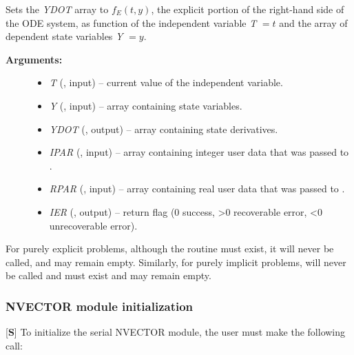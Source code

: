 \documentclass[letterpaper,10pt,english]{sphinxmanual}
\begin{document}
\begin{fulllineitems}
\label{f_interface/Usage:f/_/FARKEFUN}
Sets the \emph{YDOT} array to \(f_E(t,y)\), the explicit portion of
the right-hand side of the ODE system, as function of the
independent variable \emph{T} \(=t\) and the array of dependent state
variables \emph{Y} \(=y\).
\begin{description}
\item[{\textbf{Arguments:}}] \leavevmode\begin{itemize}
\item {} 
\emph{T} (, input) -- current value of the independent variable.

\item {} 
\emph{Y} (, input) -- array containing state variables.

\item {} 
\emph{YDOT} (, output) -- array containing state derivatives.

\item {} 
\emph{IPAR} (, input) -- array containing integer user
data that was passed to {\hyperref[f_interface/Usage:f/_/FARKMALLOC]{\emph{}}}.

\item {} 
\emph{RPAR} (, input) -- array containing real user
data that was passed to {\hyperref[f_interface/Usage:f/_/FARKMALLOC]{\emph{}}}.

\item {} 
\emph{IER} (, output) -- return flag (0 success, \textgreater{}0
recoverable error, \textless{}0 unrecoverable error).

\end{itemize}

\end{description}

\end{fulllineitems}


For purely explicit problems, although the routine
{\hyperref[f_interface/Usage:f/_/FARKIFUN]{\emph{}}} must exist, it will never be called, and may
remain empty.  Similarly, for purely implicit problems,
{\hyperref[f_interface/Usage:f/_/FARKEFUN]{\emph{}}} will never be called and must exist and may
remain empty.


\subsubsection{NVECTOR module initialization}
\label{f_interface/Usage:nvector-module-initialization}\label{f_interface/Usage:finterface-nvector}
{[}\textbf{S}{]} To initialize the serial NVECTOR module, the user must
make the following call:
\end{document}

